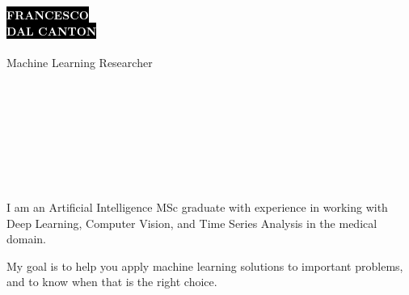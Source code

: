 \documentclass[9pt]{developercv}
\begin{document}

\begin{minipage}[t]{0.45\textwidth}
    \vspace{-\baselineskip}
    \colorbox{black}{{\fontsize{26}{0}\textcolor{white}{\textbf{\MakeUppercase{Francesco}}}}}\\    
    \colorbox{black}{{\fontsize{26}{0}\textcolor{white}{\textbf{\MakeUppercase{Dal Canton}}}}}\\
    \vspace{1pt}\\
    {\huge Machine Learning Researcher}
\end{minipage}
\begin{minipage}[t]{0.27\textwidth}
    \vspace{-\baselineskip}
    \\
    \\
    \\
\end{minipage}
\begin{minipage}[t]{0.28\textwidth}
    \vspace{-\baselineskip}
    \\
    \\
    \\
\end{minipage}

\vspace{0.2cm}



\begin{minipage}[t]{0.4\textwidth}
    \vspace{-\baselineskip}
    I am an Artificial Intelligence MSc graduate with experience in working with Deep Learning, Computer Vision, and Time Series Analysis in the medical domain.
    
    My goal is to help you apply machine learning solutions to important problems, and to know when that is the right choice.
\end{minipage}
\hfill
\begin{minipage}[t]{0.5\textwidth}
\vspace{-\baselineskip}
    \begin{barchart}{5.5}
    \end{barchart}
\end{minipage}
\end{document}
